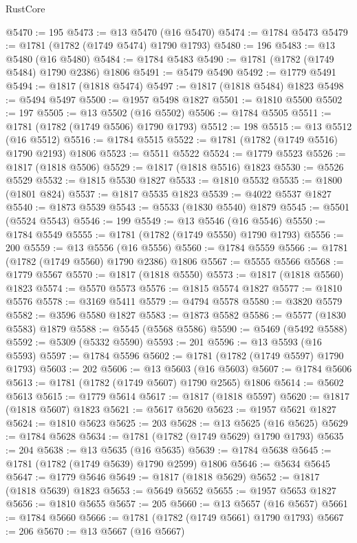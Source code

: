 \begin{lexlean}{RustCore}
\begin{coremodule}
@5470 := 195
@5473 := @13 @5470 (@16 @5470)
@5474 := @1784 @5473
@5479 := @1781 (@1782 (@1749 @5474) @1790 @1793)
@5480 := 196
@5483 := @13 @5480 (@16 @5480)
@5484 := @1784 @5483
@5490 := @1781 (@1782 (@1749 @5484) @1790 @2386) @1806
@5491 := @5479 @5490
@5492 := @1779 @5491
@5494 := @1817 (@1818 @5474)
@5497 := @1817 (@1818 @5484) @1823
@5498 := @5494 @5497
@5500 := @1957 @5498 @1827
@5501 := @1810 @5500
@5502 := 197
@5505 := @13 @5502 (@16 @5502)
@5506 := @1784 @5505
@5511 := @1781 (@1782 (@1749 @5506) @1790 @1793)
@5512 := 198
@5515 := @13 @5512 (@16 @5512)
@5516 := @1784 @5515
@5522 := @1781 (@1782 (@1749 @5516) @1790 @2193) @1806
@5523 := @5511 @5522
@5524 := @1779 @5523
@5526 := @1817 (@1818 @5506)
@5529 := @1817 (@1818 @5516) @1823
@5530 := @5526 @5529
@5532 := @1815 @5530 @1827
@5533 := @1810 @5532
@5535 := @1800 (@1801 @824)
@5537 := @1817 @5535 @1823
@5539 := @4022 @5537 @1827
@5540 := @1873 @5539
@5543 := @5533 (@1830 @5540) @1879
@5545 := @5501 (@5524 @5543)
@5546 := 199
@5549 := @13 @5546 (@16 @5546)
@5550 := @1784 @5549
@5555 := @1781 (@1782 (@1749 @5550) @1790 @1793)
@5556 := 200
@5559 := @13 @5556 (@16 @5556)
@5560 := @1784 @5559
@5566 := @1781 (@1782 (@1749 @5560) @1790 @2386) @1806
@5567 := @5555 @5566
@5568 := @1779 @5567
@5570 := @1817 (@1818 @5550)
@5573 := @1817 (@1818 @5560) @1823
@5574 := @5570 @5573
@5576 := @1815 @5574 @1827
@5577 := @1810 @5576
@5578 := @3169 @5411
@5579 := @4794 @5578
@5580 := @3820 @5579
@5582 := @3596 @5580 @1827
@5583 := @1873 @5582
@5586 := @5577 (@1830 @5583) @1879
@5588 := @5545 (@5568 @5586)
@5590 := @5469 (@5492 @5588)
@5592 := @5309 (@5332 @5590)
@5593 := 201
@5596 := @13 @5593 (@16 @5593)
@5597 := @1784 @5596
@5602 := @1781 (@1782 (@1749 @5597) @1790 @1793)
@5603 := 202
@5606 := @13 @5603 (@16 @5603)
@5607 := @1784 @5606
@5613 := @1781 (@1782 (@1749 @5607) @1790 @2565) @1806
@5614 := @5602 @5613
@5615 := @1779 @5614
@5617 := @1817 (@1818 @5597)
@5620 := @1817 (@1818 @5607) @1823
@5621 := @5617 @5620
@5623 := @1957 @5621 @1827
@5624 := @1810 @5623
@5625 := 203
@5628 := @13 @5625 (@16 @5625)
@5629 := @1784 @5628
@5634 := @1781 (@1782 (@1749 @5629) @1790 @1793)
@5635 := 204
@5638 := @13 @5635 (@16 @5635)
@5639 := @1784 @5638
@5645 := @1781 (@1782 (@1749 @5639) @1790 @2599) @1806
@5646 := @5634 @5645
@5647 := @1779 @5646
@5649 := @1817 (@1818 @5629)
@5652 := @1817 (@1818 @5639) @1823
@5653 := @5649 @5652
@5655 := @1957 @5653 @1827
@5656 := @1810 @5655
@5657 := 205
@5660 := @13 @5657 (@16 @5657)
@5661 := @1784 @5660
@5666 := @1781 (@1782 (@1749 @5661) @1790 @1793)
@5667 := 206
@5670 := @13 @5667 (@16 @5667)

\end{coremodule}
\end{lexlean}
